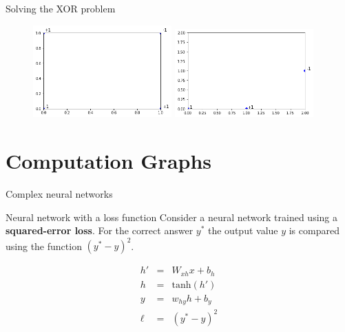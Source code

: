 \begin{frame}{Solving the XOR problem}
\begin{figure}
   \includegraphics[width=0.475\textwidth]{figures/ff/xorbefore.png}
   \hfill
   \includegraphics[width=0.475\textwidth]{figures/ff/xorafter.png}
\end{figure}
\end{frame}

\section{Computation Graphs}
\frame{\tableofcontents[currentsection]}

\begin{frame}{Complex neural networks}
\begin{block}{Neural network with a loss function}
Consider a neural network trained using a \textbf{squared-error loss}. 
For the correct answer $y^\ast$ the output value $y$ is compared using
the function $(y^\ast - y)^2$.

	\begin{eqnarray*}
		h' &=& W_{xh} x + b_h \\
		h &=& \text{tanh}(h') \\
		y &=& w_{hy} h + b_y \\
		\ell &=& (y^\ast - y)^2
	\end{eqnarray*}
\end{block}

\end{frame}

